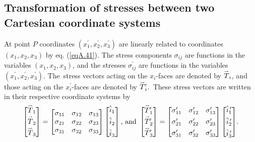 \documentclass{AeroStructure-ERJohnson}
\def\harp#1{\smash{\mathord{\buildrel{\lower3pt\hbox{$\scriptscriptstyle\rightharpoonup$}}\over{#1}}}}
\begin{document}
\subsection{Transformation of stresses between two Cartesian coordinate systems}\label{secA.2.2}

At point $P$ coordinates $(x_{1}^{\prime}, x_{2}^{\prime}, x_{3}^{\prime})$ are linearly related to coordinates $(x_{1}, x_{2}, x_{3})$ by eq. (\ref{eqA.41}). The stress components $\sigma_{i j}$ are functions in the variables $(x_{1}, x_{2}, x_{3})$, and the stresses $\sigma_{i j}^{\prime}$ are functions in the variables\break $(x_{1}^{\prime}, x_{2}^{\prime}, x_{3}^{\prime})$. The~stress vectors acting on the $x_{i}$-faces are denoted by $\harp{T}_{i}$, and those acting on the $x_{i}^{\prime}$-faces are denoted by $\harp{T}_{i}^{\prime}$.~These stress vectors are written in their respective coordinate systems by
\begin{align}\label{eqA.86}
\left[\begin{array}{@{}c@{}}\harp{T}_{1} \\[4pt] \harp{T}_{2} \\[4pt] \harp{T}_{3}\end{array}\right]=\left[\begin{array}{@{}lll@{}}\sigma_{11} & \sigma_{12} & \sigma_{13} \\\sigma_{21} & \sigma_{22} & \sigma_{23} \\\sigma_{31} & \sigma_{32} & \sigma_{33}\end{array}\right]\left[\begin{array}{@{}l@{}}\hat{i}_{1} \\[4pt] \hat{i}_{2} \\[4pt] \hat{i}_{3}\end{array}\right]\mbox{, and } \left[\begin{array}{@{}c@{}}\harp{T}_{1}^{\prime} \\[4pt] \harp{T}_{2}^{\prime} \\[4pt] \harp{T}_{3}^{\prime}\end{array}\right]=
\left[\begin{array}{@{}lll@{}}\sigma_{11}^{\prime} & \sigma_{12}^{\prime} & \sigma_{13}^{\prime} \\[4pt]\sigma_{21}^{\prime} & \sigma_{22}^{\prime} & \sigma_{23}^{\prime} \\[4pt]\sigma_{31}^{\prime} & \sigma_{32}^{\prime} & \sigma_{33}^{\prime}\end{array}\right]\left[\begin{array}{@{}l@{}}\hat{i}_{1}^{\,\prime} \\[4pt] \hat{i}_{2}^{\,\prime} \\[4pt] \hat{i}_{3}^{\,\prime}\end{array}\right]\!.
\end{align}
\end{document}

